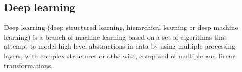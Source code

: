 \subsection{Deep learning}
Deep learning (deep structured learning, hierarchical learning or deep machine learning) is a branch of machine learning based on a set of algorithms that attempt to model high-level abstractions in data by using multiple processing layers, with complex structures or otherwise, composed of multiple non-linear transformations.

